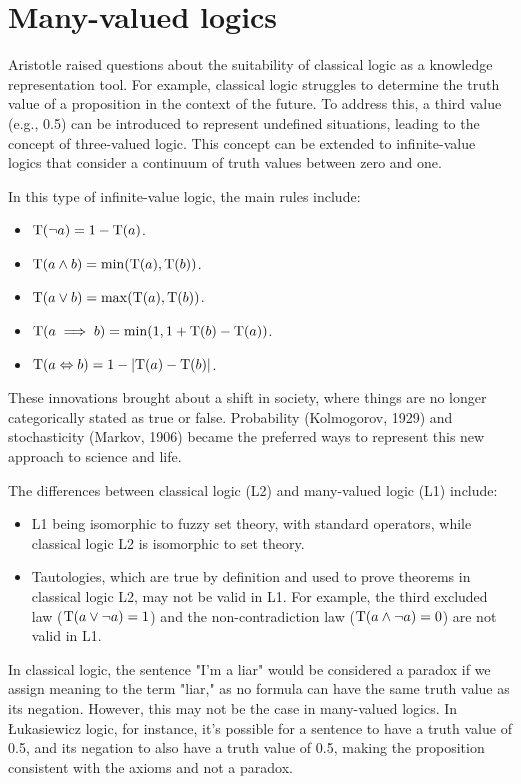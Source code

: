 \section{Many-valued logics}

Aristotle raised questions about the suitability of classical logic as a knowledge representation tool.
For example, classical logic struggles to determine the truth value of a proposition in the context of the future.
To address this, a third value (e.g., 0.5) can be introduced to represent undefined situations, leading to the concept of three-valued logic. 
This concept can be extended to infinite-value logics that consider a continuum of truth values between zero and one.
\begin{example}
    In this type of infinite-value logic, the main rules include:
    \begin{itemize}
        \item $\textnormal{T}(\lnot a)=1-\textnormal{T}(a)$.
        \item $\textnormal{T}(a \land b)=\min (\textnormal{T}(a),\textnormal{T}(b))$.
        \item $\textnormal{T}(a \lor b)=\max (\textnormal{T}(a),\textnormal{T}(b))$.
        \item $\textnormal{T}(a \implies b)=\min (1, 1+\textnormal{T}(b)-\textnormal{T}(a))$.
        \item $\textnormal{T}(a \Leftrightarrow b)=1-\left\lvert \textnormal{T}(a)-\textnormal{T}(b) \right\rvert$.
    \end{itemize}
\end{example}
These innovations brought about a shift in society, where things are no longer categorically stated as true or false. 
Probability (Kolmogorov, 1929) and stochasticity (Markov, 1906) became the preferred ways to represent this new approach to science and life.

The differences between classical logic (L2) and many-valued logic (L1) include:
\begin{itemize}
    \item L1 being isomorphic to fuzzy set theory, with standard operators, while classical logic L2 is isomorphic to set theory.
    \item Tautologies, which are true by definition and used to prove theorems in classical logic L2, may not be valid in L1. 
        For example, the third excluded law ($\textnormal{T}(a \lor \lnot a)=1$) and the non-contradiction law ($\textnormal{T}(a \land \lnot a)=0$) are not valid in L1.
\end{itemize}
In classical logic, the sentence "I'm a liar" would be considered a paradox if we assign meaning to the term "liar," as no formula can have the same truth value as its negation. 
However, this may not be the case in many-valued logics. In Łukasiewicz logic, for instance, it's possible for a sentence to have a truth value of 0.5, and its negation to also have a truth value of 0.5, making the proposition consistent with the axioms and not a paradox.